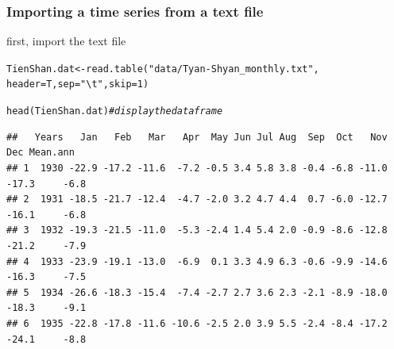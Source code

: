 \documentclass[xcolor=table, xcolor=dvipsnames]{beamer}\usepackage[]{graphicx}\usepackage[]{color}
\makeatletter
\newcommand{\hlnum}[1]{\textcolor[rgb]{0,0,0}{#1}}
\newcommand{\hlstr}[1]{\textcolor[rgb]{0.545,0.137,0.137}{#1}}
\newcommand{\hlcom}[1]{\textcolor[rgb]{0,0.392,0}{\textit{#1}}}
\newcommand{\hlstd}[1]{\textcolor[rgb]{0,0,0}{#1}}
\newcommand{\hlkwb}[1]{\textcolor[rgb]{0,0,0}{#1}}
\newcommand{\hlkwc}[1]{\textcolor[rgb]{1,0,1}{#1}}
\newcommand{\hlkwd}[1]{\textcolor[rgb]{0,0,1}{#1}}
\newenvironment{kframe}{%
 \def\at@end@of@kframe{}%
 \ifinner\ifhmode%
  \def\at@end@of@kframe{\end{minipage}}%
  \begin{minipage}{\columnwidth}%
 \fi\fi%
 \def\FrameCommand##1{\hskip\@totalleftmargin \hskip-\fboxsep
 \colorbox{shadecolor}{##1}\hskip-\fboxsep
     \hskip-\linewidth \hskip-\@totalleftmargin \hskip\columnwidth}%
 \MakeFramed {\advance\hsize-\width
   \@totalleftmargin\z@ \linewidth\hsize
   \@setminipage}}%
 {\par\unskip\endMakeFramed%
 \at@end@of@kframe}
\newenvironment{knitrout}{}{} %
\makeatother
\begin{document}
\begin{frame}[fragile]\frametitle{Importing a time series from a text file}
first, import the text file

\begin{knitrout}
\color{fgcolor}\begin{kframe}
\begin{alltt}
\hlstd{TienShan.dat} \hlkwb{<-} \hlkwd{read.table}\hlstd{(}\hlstr{"data/Tyan-Shyan_monthly.txt"}\hlstd{,}
                           \hlkwc{header} \hlstd{= T,}\hlkwc{sep}\hlstd{=}\hlstr{"\textbackslash{}t"}\hlstd{,} \hlkwc{skip}\hlstd{=}\hlnum{1}\hlstd{)}
\end{alltt}
\end{kframe}
\end{knitrout}
\begin{knitrout}\tiny
{}\color{fgcolor}\begin{kframe}
\begin{alltt}
\hlkwd{head}\hlstd{(TienShan.dat)} \hlcom{# display the data frame}
\end{alltt}
\begin{verbatim}
##   Years   Jan   Feb   Mar   Apr  May Jun Jul Aug  Sep  Oct   Nov   Dec Mean.ann
## 1  1930 -22.9 -17.2 -11.6  -7.2 -0.5 3.4 5.8 3.8 -0.4 -6.8 -11.0 -17.3     -6.8
## 2  1931 -18.5 -21.7 -12.4  -4.7 -2.0 3.2 4.7 4.4  0.7 -6.0 -12.7 -16.1     -6.8
## 3  1932 -19.3 -21.5 -11.0  -5.3 -2.4 1.4 5.4 2.0 -0.9 -8.6 -12.8 -21.2     -7.9
## 4  1933 -23.9 -19.1 -13.0  -6.9  0.1 3.3 4.9 6.3 -0.6 -9.9 -14.6 -16.3     -7.5
## 5  1934 -26.6 -18.3 -15.4  -7.4 -2.7 2.7 3.6 2.3 -2.1 -8.9 -18.0 -18.3     -9.1
## 6  1935 -22.8 -17.8 -11.6 -10.6 -2.5 2.0 3.9 5.5 -2.4 -8.4 -17.2 -24.1     -8.8
\end{verbatim}
\end{kframe}
\end{knitrout}

\end{frame}

\end{document}
